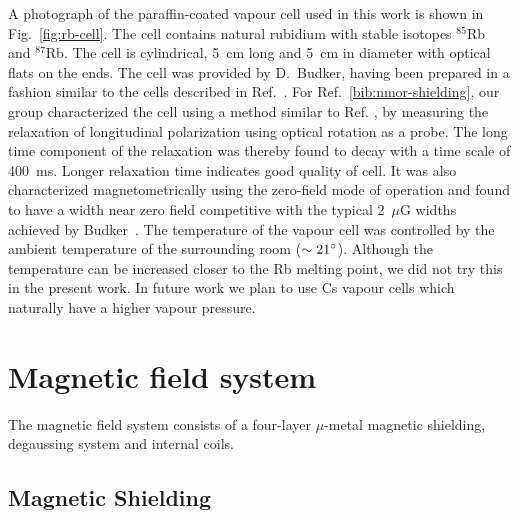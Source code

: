 A photograph of the paraffin-coated vapour cell used in this work is
shown in Fig.~\ref{fig:rb-cell}.  The cell contains natural rubidium
with stable isotopes $^{85}$Rb and $^{87}$Rb.  The cell is
cylindrical, 5~cm long and 5~cm in diameter with optical flats on the
ends.  The cell was provided by D.~Budker, having been prepared in a
fashion similar to the cells described in
Ref.~\cite{PhysRevA.72.023401}.  For Ref.~\ref{bib:nmor-shielding},
our group characterized the cell using a method similar to
Ref. \cite{PhysRevA.72.023401}, by measuring the relaxation of
longitudinal polarization using optical rotation as a probe.  The long
time component of the relaxation was thereby found to decay with a
time scale of 400~ms.  Longer relaxation time indicates good quality
of cell.  It was also characterized magnetometrically using the
zero-field mode of operation and found to have a width near zero field
competitive with the typical 2~$\mu$G widths achieved by
Budker~\cite{bib:budkers-phys-rev-1998-paper}.  The temperature of the
vapour cell was controlled by the ambient temperature of the
surrounding room ($\sim 21\degree$).  Although the temperature can be
increased closer to the Rb melting point, we did not try this in the
present work.  In future work we plan to use Cs vapour cells which
naturally have a higher vapour pressure.

\section{Magnetic field system}

The magnetic field system consists of a four-layer $\mu$-metal
magnetic shielding, degaussing system and internal coils.

\subsection{Magnetic Shielding}

